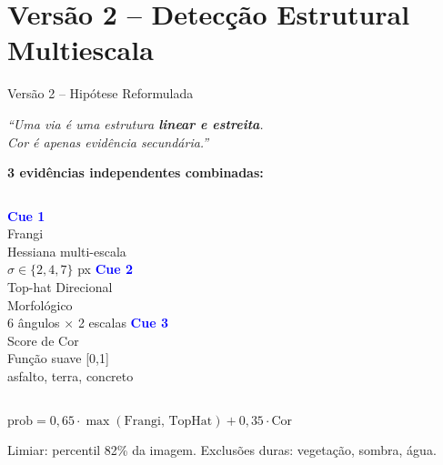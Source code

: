 \documentclass[aspectratio=169]{beamer}
\begin{document}
\section{Versão 2 -- Detecção Estrutural Multiescala}

\begin{frame}{Versão 2 -- Hipótese Reformulada}

\begin{center}
\textit{``Uma via é uma estrutura \textbf{linear e estreita}.\\Cor é apenas evidência secundária.''}
\end{center}

\medskip
\textbf{3 evidências independentes combinadas:}

\medskip
\begin{columns}
\centering
\textcolor{blue}{\textbf{Cue 1}}\\Frangi\\{\small Hessiana multi-escala\\ $\sigma \in \{2,4,7\}$ px}
\centering
\textcolor{blue}{\textbf{Cue 2}}\\Top-hat Direcional\\{\small Morfológico\\ 6 ângulos $\times$ 2 escalas}
\centering
\textcolor{blue}{\textbf{Cue 3}}\\Score de Cor\\{\small Função suave [0,1]\\ asfalto, terra, concreto}
\end{columns}

\bigskip
\centering
$\text{prob} = 0{,}65 \cdot \max(\text{Frangi},\,\text{TopHat}) + 0{,}35 \cdot \text{Cor}$

\medskip
{\small Limiar: percentil 82\% da imagem. Exclusões duras: vegetação, sombra, água.}
\end{frame}
\end{document}
